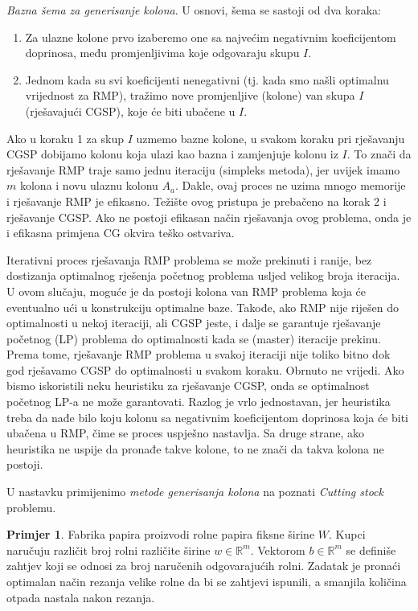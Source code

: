 \documentclass[a4paper, utf8, 11pt, colorlinks]{book}
\theoremstyle{definition}
\newtheorem{primjer}{Primjer}[chapter]
\begin{document}
\emph{Bazna šema za generisanje kolona}. U osnovi, šema se sastoji od dva koraka:
\begin{enumerate}
	\item  Za ulazne kolone prvo izaberemo one sa najvećim negativnim koeficijentom doprinosa, među promjenljivima koje odgovaraju skupu $I$.
	\item Jednom kada su svi koeficijenti nenegativni (tj. kada smo našli optimalnu vrijednost za  RMP), tražimo nove promjenljive (kolone) van skupa $I$ (rješavajući CGSP), koje će biti ubačene u $I$. 
\end{enumerate}
Ako u koraku 1 za skup $I$ uzmemo bazne kolone, u svakom koraku pri rješavanju CGSP dobijamo kolonu koja ulazi kao bazna i zamjenjuje kolonu iz $I$. To znači da rješavanje RMP traje samo jednu iteraciju (simpleks metoda), jer uvijek imamo $m$ kolona i novu ulaznu kolonu $A_a$. Dakle, ovaj proces ne uzima mnogo memorije i rješavanje RMP je efikasno. Težište ovog pristupa je   prebačeno na korak 2 i rješavanje CGSP. Ako ne postoji efikasan način rješavanja ovog problema, onda je i efikasna primjena CG okvira teško ostvariva.  
 

Iterativni proces rješavanja RMP problema se može prekinuti i ranije, bez dostizanja optimalnog rješenja početnog problema usljed velikog broja iteracija. U ovom slučaju, moguće je da postoji kolona van RMP problema koja će eventualno ući u konstrukciju optimalne baze.  Takođe, ako RMP nije riješen do optimalnosti u nekoj iteraciji, ali CGSP jeste, i dalje se garantuje rješavanje početnog (LP) problema do optimalnosti kada se (master) iteracije prekinu. Prema tome, rješavanje RMP problema u svakoj iteraciji nije toliko bitno dok god rješavamo CGSP do optimalnosti u svakom koraku. Obrnuto ne vrijedi.   Ako bismo iskoristili neku heuristiku za rješavanje CGSP, onda se optimalnost početnog LP-a ne može garantovati. Razlog je vrlo jednostavan, jer heuristika treba da nađe bilo koju kolonu sa negativnim koeficijentom doprinosa koja će biti ubačena u RMP, čime se proces uspješno nastavlja. Sa druge strane, ako heuristika ne uspije da pronađe takve kolone, to ne znači da takva kolona ne postoji. 


 U nastavku primijenimo \emph{metode generisanja kolona} na poznati \emph{Cutting stock} problemu. 
 
\begin{primjer} Fabrika papira proizvodi rolne papira fiksne širine  $W$. 
 Kupci naručuju različit broj rolni različite širine $w \in \mathbb{R}^m$. Vektorom $b \in \mathbb{R}^m$ se definiše zahtjev koji se odnosi za broj naručenih odgovarajućih rolni.  Zadatak je pronaći optimalan način  rezanja velike rolne da bi se zahtjevi ispunili, a smanjila količina otpada nastala nakon rezanja. 
 \end{primjer}
\end{document}
